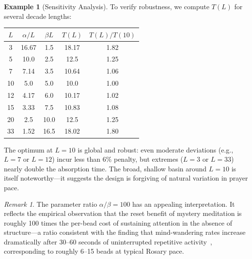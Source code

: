 \documentclass[journal]{IEEEtran}
\theoremstyle{definition}
\newtheorem{example}[theorem]{Example}
\theoremstyle{remark}
\newtheorem{remark}[theorem]{Remark}
\begin{document}
\begin{example}[Sensitivity Analysis]\label{ex:sensitivity}
To verify robustness, we compute $T(L)$ for several decade lengths:
\begin{center}
\begin{tabular}{@{}ccccc@{}}
\toprule
$L$ & $\alpha/L$ & $\beta L$ & $T(L)$ & $T(L)/T(10)$ \\
\midrule
3 & 16.67 & 1.5 & 18.17 & 1.82 \\
5 & 10.0 & 2.5 & 12.5 & 1.25 \\
7 & 7.14 & 3.5 & 10.64 & 1.06 \\
10 & 5.0 & 5.0 & 10.0 & 1.00 \\
12 & 4.17 & 6.0 & 10.17 & 1.02 \\
15 & 3.33 & 7.5 & 10.83 & 1.08 \\
20 & 2.5 & 10.0 & 12.5 & 1.25 \\
33 & 1.52 & 16.5 & 18.02 & 1.80 \\
\bottomrule
\end{tabular}
\end{center}
The optimum at $L = 10$ is global and robust: even moderate deviations (e.g., $L = 7$ or $L = 12$) incur less than $6\%$ penalty, but extremes ($L = 3$ or $L = 33$) nearly double the absorption time. The broad, shallow basin around $L = 10$ is itself noteworthy---it suggests the design is forgiving of natural variation in prayer pace.
\end{example}

\begin{remark}
The parameter ratio $\alpha/\beta = 100$ has an appealing interpretation. It reflects the empirical observation that the reset benefit of mystery meditation is roughly 100 times the per-bead cost of sustaining attention in the absence of structure---a ratio consistent with the finding that mind-wandering rates increase dramatically after 30--60 seconds of uninterrupted repetitive activity~\cite{smallwood2006}, corresponding to roughly 6--15 beads at typical Rosary pace.
\end{remark}

\end{document}
